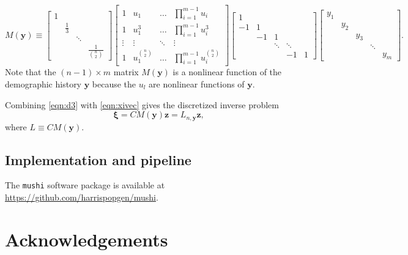 \documentclass[11pt]{article}
\begin{document}
\begin{equation}
\label{eqn:M}
M(\boldsymbol y) \equiv
\begin{bmatrix}
1 &             &        &                       \\
  & \frac{1}{3} &        &                       \\
  &             & \ddots &                       \\
  &             &        & \frac{1}{\binom{n}{2}}
\end{bmatrix}
\begin{bmatrix}
1       & u_1                & \hdots & \prod_{i=1}^{m-1}u_i               \\
1       & u_1^3              & \hdots & \prod_{i=1}^{m-1}u_i^3             \\
\vdots  & \vdots             & \ddots & \vdots                                \\
1       & u_1^{\binom{n}{2}} & \hdots & \prod_{i=1}^{m-1}u_i^{\binom{n}{2}}
\end{bmatrix}
\begin{bmatrix}
1  &      &        &             &       \\
-1 & 1  &        &             &       \\
     & -1 & 1    &             &       \\
     &      & \ddots & \ddots      &       \\
     &      &        & -1 & 1
\end{bmatrix}
\begin{bmatrix}
y_1 &     &      &             &       \\
    & y_2 &      &             &       \\
     &     & y_3 &             &       \\
     &      &    & \ddots      &       \\
     &      &        &  & y_m
\end{bmatrix}.
\end{equation}
Note that the $(n-1)\times m$ matrix $M(\boldsymbol y)$ is a nonlinear function of the demographic history $\boldsymbol y$ because the $u_l$ are nonlinear functions of $\boldsymbol y$.

Combining \ref{eqn:d3} with \ref{eqn:xivec} gives the discretized inverse problem
\begin{equation}
\boldsymbol\xi = C M(\boldsymbol y) \boldsymbol z = L_{n, \boldsymbol y} \boldsymbol z,
\end{equation}
where $L\equiv C M(\boldsymbol y)$.


\subsection{Implementation and pipeline}\label{sec:methods:tool}

The \texttt{mushi} software package is available at \url{https://github.com/harrispopgen/mushi}.

\section{Acknowledgements}\label{sec:ack}



\end{document}
